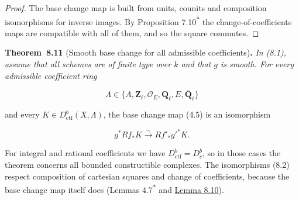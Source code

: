 \documentclass[11pt]{article}
\newenvironment{bpstatement}[2]{\par\addvspace{0.6\baselineskip}\noindent\textbf{#1}#2\textbf{.}\enspace\ignorespaces}
  {\par\addvspace{0.4\baselineskip}}
\newenvironment{bpstatementit}[2]{\begin{bpstatement}{#1}{#2}\itshape\ignorespaces}{\end{bpstatement}}
\newcommand{\bpout}[1]{#1\textsuperscript{\hyperlink{bp-outside}{\ensuremath{\ast}}}}
\providecommand{\Dbc}{}\renewcommand{\Dbc}{D^b_c}
\begin{document}
\begin{proof}[{Proof}]\label{bp44}%
The base change map is built from units, counits and composition isomorphisms for inverse images. By Proposition \bpout{7.10} the change-of-coefficients maps are compatible with all of them, and so the square commutes.
\end{proof}

\label{bp45}%
\begin{bpstatementit}{Theorem~8.11}{ (Smooth base change for all admissible coefficients)}
In (8.1), assume that all schemes are of finite type over \(k\) and that \(g\) is smooth. For every admissible coefficient ring

\[
\Lambda\in\{A,\mathbf Z_\ell,\mathcal O_E,\mathbf Q_\ell,E,\overline{\mathbf Q}_\ell\}
\]

and every \(K\in D^b_{\mathrm{ctf}}(X,\Lambda)\), the base change map (4.5) is an isomorphism

\[
g^*Rf_*K\xrightarrow{\sim}Rf'_*g'^*K.
\tag{8.2}
\]
\end{bpstatementit}

\label{bp46}%
For integral and rational coefficients we have \(D^b_{\mathrm{ctf}}=\Dbc\), so in those cases the theorem concerns all bounded constructible complexes. The isomorphisms (8.2) respect composition of cartesian squares and change of coefficients, because the base change map itself does (Lemmas \bpout{4.7} and \hyperref[bp43]{Lemma 8.10}).
\end{document}
